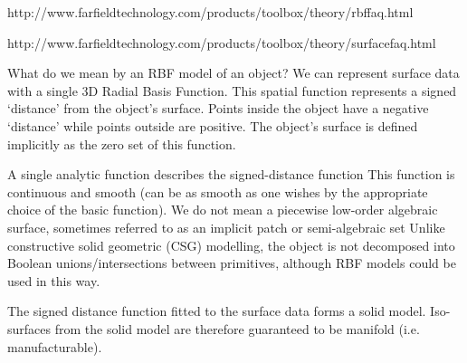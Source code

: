 http://www.farfieldtechnology.com/products/toolbox/theory/rbffaq.html

http://www.farfieldtechnology.com/products/toolbox/theory/surfacefaq.html

What do we mean by an RBF model of an object?
We can represent surface data with a single 3D Radial Basis Function. This spatial function represents a signed `distance' from the object's surface. Points inside the object have a negative `distance' while points outside are positive. The object's surface is defined implicitly as the zero set of this function.

    A single analytic function describes the signed-distance function
    This function is continuous and smooth (can be as smooth as one wishes by the appropriate choice of the basic function).
    We do not mean a piecewise low-order algebraic surface, sometimes referred to as an implicit patch or semi-algebraic set
    Unlike constructive solid geometric (CSG) modelling, the object is not decomposed into Boolean unions/intersections between primitives, although RBF models could be used in this way.

The signed distance function fitted to the surface data forms a solid model. Iso-surfaces from the solid model are therefore guaranteed to be manifold (i.e. manufacturable).